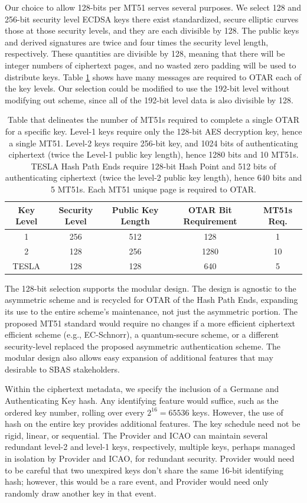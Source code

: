 \documentclass[letterpaper,times]{IONconf/IONconf}
\begin{document}
Our choice to allow 128-bits per MT51 serves several purposes.
We select 128 and 256-bit security level ECDSA keys there exist standardized, secure elliptic curves those at those security levels, and they are each divisible by 128.
The public keys and derived signatures are twice and four times the security level length, respectively.
These quantities are divisible by 128, meaning that there will be integer numbers of ciphertext pages, and no wasted zero padding will be used to distribute keys.
Table \ref{tab: ciphertext lengths} shows have many messages are required to OTAR each of the key levels.
Our selection could be modified to use the 192-bit level without modifying out scheme, since all of the 192-bit level data is also divisible by 128.
\begin{table}[H]
\center
\begin{tabular}{|c|c|c|c|c|} \hline
	Key Level & Security Level & Public Key Length & OTAR Bit Requirement & MT51s Req. \\ \hline
	    1 & 256 & 512 &  128 & 1 \\ \hline
	    2 & 128 & 256 & 1280 & 10\\ \hline
	TESLA & 128 & 128 &  640 & 5 \\ \hline
\end{tabular}
\caption{Table that delineates the number of MT51s required to complete a single OTAR for a specific key. Level-1 keys require only the 128-bit AES decryption key, hence a single MT51. Level-2 keys require 256-bit key, and 1024 bits of authenticating ciphertext (twice the Level-1 public key length), hence 1280 bits and 10 MT51s. TESLA Hash Path Ends require 128-bit Hash Point and 512 bits of authenticating ciphertext (twice the level-2 public key length), hence 640 bits and 5 MT51s. Each MT51 unique page is required to OTAR.}
\label{tab: ciphertext lengths}
\end{table}

The 128-bit selection supports the modular design.
The design is agnostic to the asymmetric scheme and is recycled for OTAR of the Hash Path Ends, expanding its use to the entire scheme's maintenance, not just the asymmetric portion.
The proposed MT51 standard would require no changes if a more efficient ciphertext efficient scheme (e.g., EC-Schnorr), a quantum-secure scheme, or a different security-level replaced the proposed asymmetric authentication scheme.
The modular design also allows easy expansion of additional features that may desirable to SBAS stakeholders.

Within the ciphertext metadata, we specify the inclusion of a Germane and Authenticating Key hash.
Any identifying feature would suffice, such as the ordered key number, rolling over every $2^{16} = 65536$ keys.
However, the use of hash on the entire key provides additional features.
The key schedule need not be rigid, linear, or sequential.
The Provider and ICAO can maintain several redundant level-2 and level-1 keys, respectively, multiple keys, perhaps managed in isolation by Provider and ICAO, for redundant security.
Provider would need to be careful that two unexpired keys don't share the same 16-bit identifying hash; however, this would be a rare event, and Provider would need only randomly draw another key in that event.
\end{document}
